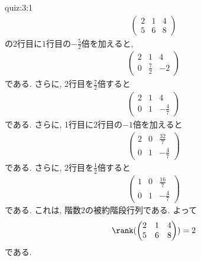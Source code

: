 \begin{answerof}{quiz:3:1}
  \begin{align*}
    \begin{pmatrix}
      2&1&4\\5&6&8
    \end{pmatrix}
  \end{align*}
  の$2$行目に$1$行目の$-\frac{5}{2}$倍を加えると,
  \begin{align*}
    \begin{pmatrix}
      2&1&4\\0&\frac{7}{2}&-2
    \end{pmatrix}
  \end{align*}
  である. さらに,
  2行目を$\frac{7}{2}$倍すると
  \begin{align*}
    \begin{pmatrix}
      2&1&4\\0&1&-\frac{4}{7}
    \end{pmatrix}
  \end{align*}
  である. さらに,
  1行目に2行目の$-1$倍を加えると
  \begin{align*}
    \begin{pmatrix}
      2&0&\frac{32}{7}\\0&1&-\frac{4}{7}
    \end{pmatrix}
  \end{align*}
  である. さらに,
  2行目を$\frac{1}{2}$倍すると
  \begin{align*}
    \begin{pmatrix}
      1&0&\frac{16}{7}\\0&1&-\frac{4}{7}
    \end{pmatrix}
  \end{align*}
  である.
  これは, 階数$2$の被約階段行列である.
  よって
  \begin{align*}
    \rank(
    \begin{pmatrix}
      2&1&4\\5&6&8
    \end{pmatrix}
    )=2
  \end{align*}
  である.
\end{answerof}

\endinput
